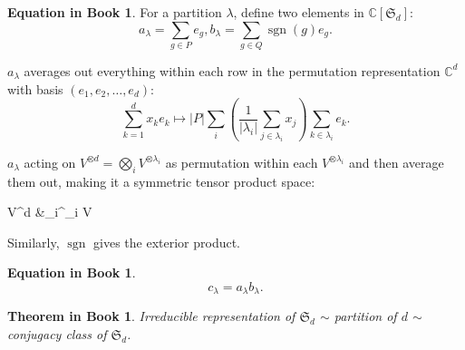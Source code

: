 \documentclass[12pt, letterpaper]{article}
\newcommand{\co}{\mathbb{C}}
\newcommand{\sgn}{\operatorname{sgn}}
\newcommand{\Sym}{\operatorname{Sym}}
\newcommand{\card}[1]{\left\lvert #1 \right\rvert}
\newenvironment{centikzcd}{\center\tikzcd}{\endtikzcd\endcenter}
\theoremstyle{definition}
\theoremstyle{remark}
\theoremstyle{definition}
\newtheorem{eq}[exe]{Equation in Book}
\theoremstyle{plain}
\newtheorem{tthm}[exe]{Theorem in Book}
\numberwithin{equation}{section}
\begin{document}
	\begin{eq}
		For a partition $\lambda$, define two elements in $\co[\mathfrak{S}_d]$:
		\[a_\lambda=\sum_{g\in P}e_g,b_\lambda=\sum_{g\in Q}\sgn (g)e_g.\]
	\end{eq}
	
	$a_\lambda$ averages out everything within each row in the permutation representation $\co^d$
	with basis $(e_1,e_2,\dots,e_d)$:
	\[ \sum_{k=1}^dx_ke_k\mapsto \card{P}\sum_i\left(\frac{1}{\card{\lambda_i}}\sum_{j\in\lambda_i} x_j\right)\sum_{k\in\lambda_i}e_k.  \]
	
	$a_\lambda$ acting on $V^{\otimes d}=\bigotimes_i V^{\otimes \lambda_i}$
	as permutation within each $V^{\otimes \lambda_i}$ and then average them out,
	making it a symmetric tensor product space:
	
	\begin{centikzcd}\label{figAlambdaOnVd}
		V^{\otimes d} \ar[r,"a_\lambda"]&\bigotimes_i\Sym^{\lambda_i} V\\
	\end{centikzcd}



	Similarly, $\sgn$ gives the exterior product.
	
	\begin{eq}
		\[c_\lambda=a_\lambda b_\lambda.\]
	\end{eq}
	
	\begin{tthm}
		Irreducible representation of $\mathfrak{S}_d$ $\sim$ partition of $d$ $\sim$ conjugacy class of $\mathfrak{S}_d$.
	\end{tthm}
\end{document}
